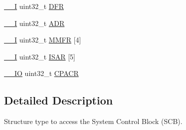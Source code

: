 \begin{DoxyCompactItemize}
\item 
\hyperlink{group___c_m_s_i_s__core__definitions_gaf63697ed9952cc71e1225efe205f6cd3}{\-\_\-\-\_\-\-I} uint32\-\_\-t \hyperlink{struct_s_c_b___type_a1b9a71780ae327f1f337a2176b777618}{D\-F\-R}
\item 
\hyperlink{group___c_m_s_i_s__core__definitions_gaf63697ed9952cc71e1225efe205f6cd3}{\-\_\-\-\_\-\-I} uint32\-\_\-t \hyperlink{struct_s_c_b___type_a5c0e2e1c7195d4dc09a5ca077c596318}{A\-D\-R}
\item 
\hyperlink{group___c_m_s_i_s__core__definitions_gaf63697ed9952cc71e1225efe205f6cd3}{\-\_\-\-\_\-\-I} uint32\-\_\-t \hyperlink{struct_s_c_b___type_a037095d7dc8c30536cab793e28329c45}{M\-M\-F\-R} \mbox{[}4\mbox{]}
\item 
\hyperlink{group___c_m_s_i_s__core__definitions_gaf63697ed9952cc71e1225efe205f6cd3}{\-\_\-\-\_\-\-I} uint32\-\_\-t \hyperlink{struct_s_c_b___type_abdeaebf965a4ca1dfde816cab85f1156}{I\-S\-A\-R} \mbox{[}5\mbox{]}
\item 
\hyperlink{group___c_m_s_i_s__core__definitions_gaec43007d9998a0a0e01faede4133d6be}{\-\_\-\-\_\-\-I\-O} uint32\-\_\-t \hyperlink{struct_s_c_b___type_acccaf5688449c8253e9952ddc2161528}{C\-P\-A\-C\-R}
\end{DoxyCompactItemize}


\subsection{Detailed Description}
Structure type to access the System Control Block (S\-C\-B). 

